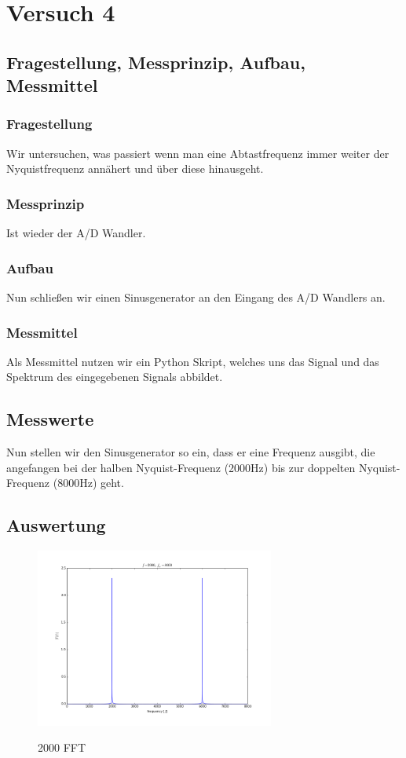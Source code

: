 \documentclass[TGAI_Laborbericht.tex]{subfiles}
\begin{document}
\chapter{Versuch 4}
\label{chap:VERSUCH_4}

\section{Fragestellung, Messprinzip, Aufbau, Messmittel}
\label{chap:VERSUCH_4_FRAGESTELLUNG}
\subsection{Fragestellung}
Wir untersuchen, was passiert wenn man eine Abtastfrequenz immer weiter der Nyquistfrequenz annähert und über diese hinausgeht.
\subsection{Messprinzip}
Ist wieder der A/D Wandler.
\subsection{Aufbau}
Nun schließen wir einen Sinusgenerator an den Eingang des A/D Wandlers an.
\subsection{Messmittel}
Als Messmittel nutzen wir ein Python Skript, welches uns das Signal und das Spektrum des eingegebenen Signals abbildet.
\section{Messwerte}
\label{chap:VERSUCH_4_MESSWERTE}
Nun stellen wir den Sinusgenerator so ein, dass er eine Frequenz ausgibt, die angefangen bei der halben Nyquist-Frequenz (2000Hz) bis zur doppelten Nyquist-Frequenz (8000Hz) geht.
\section{Auswertung}
\label{chap:VERSUCH_4_AUSWERTUNG}

\begin{figure}[H]
	\includegraphics[width=0.7\textwidth]{media/2000-fft.png}
	\label{2000 FFT}
	\caption{2000 FFT}
\end{figure}
\end{document}
